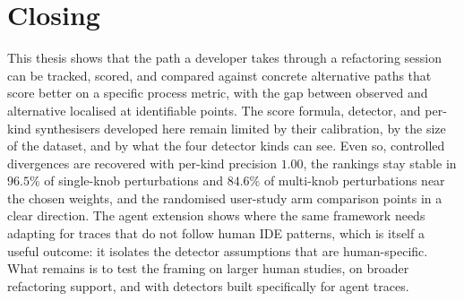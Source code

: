 \section{Closing}
\label{sec:conclusion-closing}

This thesis shows that the path a developer takes through a refactoring session can be tracked, scored, and compared against concrete alternative paths that score better on a specific process metric, with the gap between observed and alternative localised at identifiable points. The score formula, detector, and per-kind synthesisers developed here remain limited by their calibration, by the size of the dataset, and by what the four detector kinds can see. Even so, controlled divergences are recovered with per-kind precision $1.00$, the rankings stay stable in $96.5\%$ of single-knob perturbations and $84.6\%$ of multi-knob perturbations near the chosen weights, and the randomised user-study arm comparison points in a clear direction. The agent extension shows where the same framework needs adapting for traces that do not follow human IDE patterns, which is itself a useful outcome: it isolates the detector assumptions that are human-specific. What remains is to test the framing on larger human studies, on broader refactoring support, and with detectors built specifically for agent traces.
